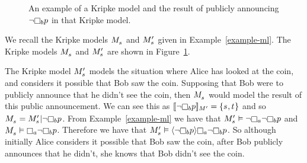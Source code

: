 \begin{example}\label{example-pal-ml}
\begin{figure}
    \caption{An example of a Kripke model and the result of publicly announcing $\lnot \knowsB \atomP$ in that Kripke model.}\label{example-pal-ml-figure}
    \centering
\end{figure}
We recall the Kripke models $\kPModel{\kStateS}$ and $\kPModelP{\kStateS}$ given in Example~\ref{example-ml}.
The Kripke models $\kPModel{\kStateS}$ and $\kPModelP{\kStateS}$ are shown in Figure~\ref{example-pal-ml-figure}.

The Kripke model $\kPModelP{\kStateS}$ models the situation where Alice has looked at the coin, and considers it possible that Bob saw the coin.
Supposing that Bob were to publicly announce that he didn't see the coin, then $\kPModel{\kStateS}$ would model the result of this public announcement.
We can see this as $\interpretation[\kModelP]{\lnot \knowsB \atomP} = \{\kStateS, \kStateT\}$ and so $\kPModel{\kStateS} = \restrict{\kPModelP{\kStateS}}{\lnot \knowsB \atomP}$.
From Example~\ref{example-ml} we have that $\kPModelP{\kStateS} \entails \lnot \knowsA \lnot \knowsB \atomP$ and $\kPModel{\kStateS} \entails \knowsA \lnot \knowsB \atomP$.
Therefore we have that $\kPModelP{\kStateS} \entails \announceE{\lnot \knowsB \atomP} \knowsA \lnot \knowsB \atomP$.
So although initially Alice considers it possible that Bob saw the coin, after Bob publicly announces that he didn't, she knows that Bob didn't see the coin.
\end{example}

